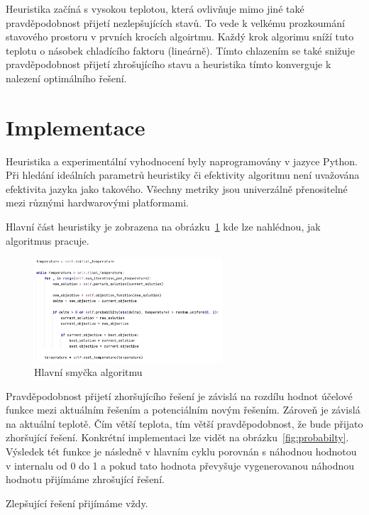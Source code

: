 \documentclass[twoside,twocolumn]{article}
\begin{document}
    Heuristika začíná s vysokou teplotou, která ovlivňuje mimo jiné také pravděpodobnost přijetí nezlepšujících stavů.
    To vede k velkému prozkoumání stavového prostoru v prvních krocích algoirtmu.
    Každý krok algorimu sníží tuto teplotu o násobek chladícího faktoru (lineárně).
    Tímto chlazením se také snižuje pravděpodobnost přijetí zhrošujícího stavu a heuristika tímto konverguje k nalezení
    optimálního řešení.



    \section{Implementace}

    Heuristika a experimentální vyhodnocení byly naprogramovány v jazyce Python.
    Při hledání ideálních parametrů heuristiky či efektivity algoritmu není uvažována efektivita jazyka jako takového.
    Všechny metriky jsou univerzálně přenositelné mezi různými hardwarovými platformami.

    Hlavní část heuristiky je zobrazena na obrázku~\ref{fig:main-loop} kde lze nahlédnou, jak algoritmus pracuje.

    \begin{figure}
        \centering
        \includegraphics[width=7cm]{images/main-loop}
        \caption{Hlavní smyčka algoritmu}
        \label{fig:main-loop}
    \end{figure}

    Pravděpodobnost přijetí zhoršujícího řešení je závislá na rozdílu hodnot účelové funkce mezi aktuálním řešením a potenciálním novým řešením.
    Zároveň je závislá na aktuální teplotě. Čím větší teplota, tím větší pravděpodobnost, že bude přijato zhoršující řešení.
    Konkrétní implementaci lze vidět na obrázku~\ref{fig:probabilty}.
    Výsledek tét funkce je následně v hlavním cyklu porovnán s náhodnou hodnotou v internalu od 0 do 1 a pokud tato hodnota
    převyšuje vygenerovanou náhodnou hodnotu přijímáme zhrošující řešení.

    Zlepšující řešení přijímáme vždy.
\end{document}
